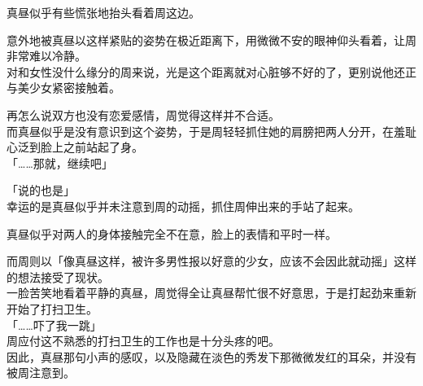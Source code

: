 真昼似乎有些慌张地抬头看着周这边。

意外地被真昼以这样紧贴的姿势在极近距离下，用微微不安的眼神仰头看着，让周非常难以冷静。\\

对和女性没什么缘分的周来说，光是这个距离就对心脏够不好的了，更别说他还正与美少女紧密接触着。

再怎么说双方也没有恋爱感情，周觉得这样并不合适。\\%

而真昼似乎是没有意识到这个姿势，于是周轻轻抓住她的肩膀把两人分开，在羞耻心泛到脸上之前站起了身。\\

「……那就，继续吧」

「说的也是」\\

幸运的是真昼似乎并未注意到周的动摇，抓住周伸出来的手站了起来。

真昼似乎对两人的身体接触完全不在意，脸上的表情和平时一样。

而周则以「像真昼这样，被许多男性报以好意的少女，应该不会因此就动摇」这样的想法接受了现状。\\

一脸苦笑地看着平静的真昼，周觉得全让真昼帮忙很不好意思，于是打起劲来重新开始了打扫卫生。\\

「……吓了我一跳」\\

周应付这不熟悉的打扫卫生的工作也是十分头疼的吧。\\

因此，真昼那句小声的感叹，以及隐藏在淡色的秀发下那微微发红的耳朵，并没有被周注意到。
